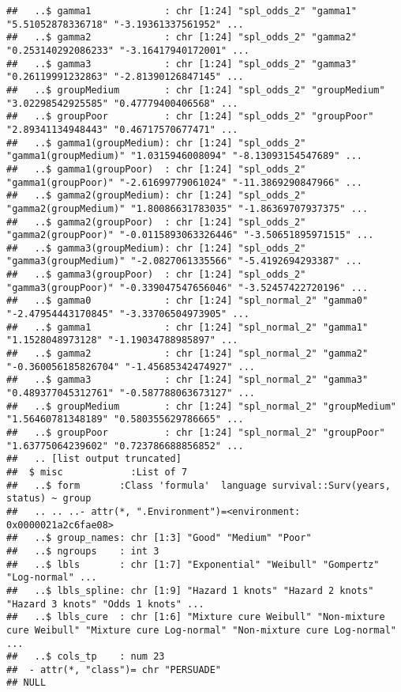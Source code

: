 \documentclass[
]{article}
\begin{document}
\begin{verbatim}
##   ..$ gamma1             : chr [1:24] "spl_odds_2" "gamma1" "5.51052878336718" "-3.19361337561952" ...
##   ..$ gamma2             : chr [1:24] "spl_odds_2" "gamma2" "0.253140292086233" "-3.16417940172001" ...
##   ..$ gamma3             : chr [1:24] "spl_odds_2" "gamma3" "0.26119991232863" "-2.81390126847145" ...
##   ..$ groupMedium        : chr [1:24] "spl_odds_2" "groupMedium" "3.02298542925585" "0.47779400406568" ...
##   ..$ groupPoor          : chr [1:24] "spl_odds_2" "groupPoor" "2.89341134948443" "0.46717570677471" ...
##   ..$ gamma1(groupMedium): chr [1:24] "spl_odds_2" "gamma1(groupMedium)" "1.0315946008094" "-8.13093154547689" ...
##   ..$ gamma1(groupPoor)  : chr [1:24] "spl_odds_2" "gamma1(groupPoor)" "-2.61699779061024" "-11.3869290847966" ...
##   ..$ gamma2(groupMedium): chr [1:24] "spl_odds_2" "gamma2(groupMedium)" "1.80086631783035" "-1.86369707937375" ...
##   ..$ gamma2(groupPoor)  : chr [1:24] "spl_odds_2" "gamma2(groupPoor)" "-0.0115893063326446" "-3.50651895971515" ...
##   ..$ gamma3(groupMedium): chr [1:24] "spl_odds_2" "gamma3(groupMedium)" "-2.0827061335566" "-5.4192694293387" ...
##   ..$ gamma3(groupPoor)  : chr [1:24] "spl_odds_2" "gamma3(groupPoor)" "-0.339047547656046" "-3.52457422720196" ...
##   ..$ gamma0             : chr [1:24] "spl_normal_2" "gamma0" "-2.47954443170845" "-3.33706504973905" ...
##   ..$ gamma1             : chr [1:24] "spl_normal_2" "gamma1" "1.1528048973128" "-1.19034788985897" ...
##   ..$ gamma2             : chr [1:24] "spl_normal_2" "gamma2" "-0.360056185826704" "-1.45685342474927" ...
##   ..$ gamma3             : chr [1:24] "spl_normal_2" "gamma3" "0.489377045312761" "-0.587788063673127" ...
##   ..$ groupMedium        : chr [1:24] "spl_normal_2" "groupMedium" "1.56460781348189" "0.580355629786665" ...
##   ..$ groupPoor          : chr [1:24] "spl_normal_2" "groupPoor" "1.63775064239602" "0.723786688856852" ...
##   .. [list output truncated]
##  $ misc            :List of 7
##   ..$ form       :Class 'formula'  language survival::Surv(years, status) ~ group
##   .. .. ..- attr(*, ".Environment")=<environment: 0x0000021a2c6fae08> 
##   ..$ group_names: chr [1:3] "Good" "Medium" "Poor"
##   ..$ ngroups    : int 3
##   ..$ lbls       : chr [1:7] "Exponential" "Weibull" "Gompertz" "Log-normal" ...
##   ..$ lbls_spline: chr [1:9] "Hazard 1 knots" "Hazard 2 knots" "Hazard 3 knots" "Odds 1 knots" ...
##   ..$ lbls_cure  : chr [1:6] "Mixture cure Weibull" "Non-mixture cure Weibull" "Mixture cure Log-normal" "Non-mixture cure Log-normal" ...
##   ..$ cols_tp    : num 23
##  - attr(*, "class")= chr "PERSUADE"
## NULL
\end{verbatim}
\end{document}
